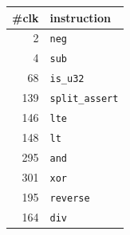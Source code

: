 \documentclass{article}
\begin{document}
\vfill%
\begin{minipage}{0.3\textwidth}
    \begin{tabular}{rl}
        \toprule
        \#clk & instruction            \\ \midrule
            2 & \texttt{neg}           \\
            4 & \texttt{sub}           \\
           68 & \texttt{is\_u32}       \\
          139 & \texttt{split\_assert} \\
          146 & \texttt{lte}           \\
          148 & \texttt{lt}            \\
          295 & \texttt{and}           \\
          301 & \texttt{xor}           \\
          195 & \texttt{reverse}       \\
          164 & \texttt{div}           \\ \bottomrule
    \end{tabular}
\end{minipage}
\end{document}
